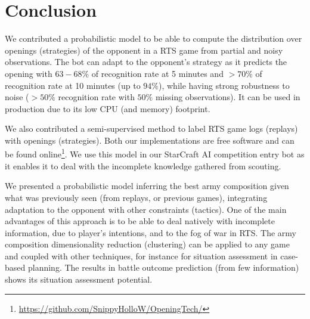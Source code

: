 \clearpage


\section{Conclusion}

We contributed a probabilistic model to be able to compute the distribution over openings (strategies) of the opponent in a RTS game from partial and noisy observations. %
The bot can adapt to the opponent's strategy as it predicts the opening with $63-68\%$ of recognition rate at 5 minutes and $>70\%$ of recognition rate at 10 minutes (up to $94\%$), while having strong robustness to noise ($>50\%$ recognition rate with $50\%$ missing observations). It can be used in production due to its low CPU (and memory) footprint. 

We also contributed a semi-supervised method to label RTS game logs (replays) with openings (strategies). Both our implementations are free software and can be found online\footnote{\url{https://github.com/SnippyHolloW/OpeningTech/}}. We use this model in our StarCraft AI competition entry bot as it enables it to deal with the incomplete knowledge gathered from scouting.

We presented a probabilistic model inferring the best army composition given what was previously seen (from replays, or previous games), integrating adaptation to the opponent with other constraints (tactics). One of the main advantages of this approach is to be able to deal natively with incomplete information, due to player's intentions, and to the fog of war in RTS. The army composition dimensionality reduction (clustering) can be applied to any game and coupled with other techniques, for instance for situation assessment in case-based planning. The results in battle outcome prediction (from few information) shows its situation assessment potential. %

